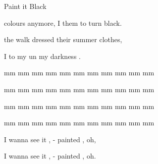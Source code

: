 \begin{SBSong}{Paint it Black}
\begin{SBVerse}
     colours anymore, I  them to turn black.
    
      the  walk  dressed  their summer clothes,
    
    I  to  my  un my darkness .
  \end{SBVerse}
  \CBPageBrk
  \begin{SBVerse}
     mm mm mm mm mm mm  mm mm mm mm mm
    
     mm mm mm mm mm mm  mm mm mm mm mm
    
     mm mm mm mm mm mm  mm mm mm mm mm
    
     mm mm mm mm mm mm  mm mm mm mm mm
    
    I wanna see it , - painted , oh,
    
    I wanna see it , - painted , oh.
  \end{SBVerse}
\end{SBSong}
